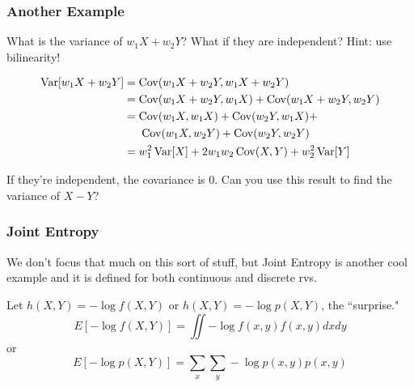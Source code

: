\documentclass{beamer}
\begin{document}
\begin{frame}
\frametitle{Another Example}

What is the variance of $w_1X + w_2Y$? What if they are independent? Hint: use bilinearity!
\pause 

\begin{align*}
\operatorname{Var}[w_1X + w_2Y] &= \operatorname{Cov}(w_1X + w_2Y, w_1X + w_2Y) \\
&= \operatorname{Cov}(w_1X + w_2Y, w_1X ) + \operatorname{Cov}(w_1X + w_2Y,  w_2Y) \\
&= \operatorname{Cov}(w_1X , w_1X ) + \operatorname{Cov}(w_2Y, w_1X )  + \\
& \hspace{5mm} \operatorname{Cov}(w_1X ,  w_2Y) + \operatorname{Cov}(w_2Y,  w_2Y) \\
&= w_1^2 \operatorname{Var}[X] + 2w_1w_2\operatorname{Cov}(X,Y) + w_2^2 \operatorname{Var}[Y] \\
\end{align*}

If they're independent, the covariance is $0$. Can you use this result to find the variance of $X-Y$?

\end{frame}

\begin{frame}
\frametitle{Joint Entropy}

We don't focus that much on this sort of stuff, but Joint Entropy is another cool example and it is defined for both continuous and discrete rvs. 
\newline

Let $h(X,Y) = -\log f(X,Y)$ or $h(X,Y) = -\log p(X,Y)$, the ``surprise."
\[
E[-\log f(X,Y)] = \iint -\log f(x,y) f(x,y)dx dy
\]
or
\[
E[-\log p(X,Y)] = \sum_x \sum_y -\log p(x,y) p(x,y)
\]

\end{frame}
\end{document}
